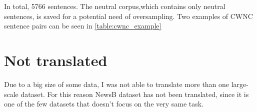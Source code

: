


In total, 5766 sentences. The neutral corpus,which contains only neutral sentences, is saved for a potential need of oversampling. Two examples of CWNC sentence pairs can be seen in \ref{table:cwnc_example}





\section{Not translated}
Due to a big size of some data, I was not able to translate more than one large-scale dataset. For this reason NewsB dataset has not been translated, since it is one of the few datasets that doesn't focus on the very same task.